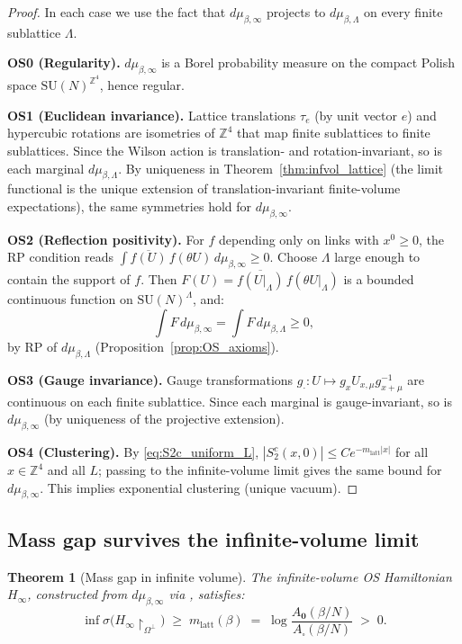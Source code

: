 \documentclass[11pt,a4paper]{amsart}
\newtheorem{theorem}{Theorem}[section]
\theoremstyle{definition}
\newcommand{\SU}{\mathrm{SU}}
\newcommand{\Z}{\mathbb{Z}}
\begin{document}
\begin{proof}
In each case we use the fact that $d\mu_{\beta,\infty}$ projects to $d\mu_{\beta,\Lambda}$
on every finite sublattice $\Lambda$.

\textbf{OS0 (Regularity).}
$d\mu_{\beta,\infty}$ is a Borel probability measure on the compact Polish space
$\SU(N)^{\Z^4}$, hence regular.

\textbf{OS1 (Euclidean invariance).}
Lattice translations $\tau_e$ (by unit vector $e$) and hypercubic rotations are
isometries of $\Z^4$ that map finite sublattices to finite sublattices.  Since
the Wilson action is translation- and rotation-invariant, so is each marginal
$d\mu_{\beta,\Lambda}$.  By uniqueness in Theorem~\ref{thm:infvol_lattice}
(the limit functional is the unique extension of translation-invariant finite-volume
expectations), the same symmetries hold for $d\mu_{\beta,\infty}$.

\textbf{OS2 (Reflection positivity).}
For $f$ depending only on links with $x^0 \ge 0$, the RP condition reads
$\int \overline{f(U)}\,f(\theta U)\,d\mu_{\beta,\infty}\ge 0$.
Choose $\Lambda$ large enough to contain the support of $f$.  Then
$F(U) = \overline{f(U|_\Lambda)}\,f(\theta U|_\Lambda)$ is a bounded continuous
function on $\SU(N)^\Lambda$, and:
\[
  \int F\,d\mu_{\beta,\infty} = \int F\,d\mu_{\beta,\Lambda} \ge 0,
\]
by RP of $d\mu_{\beta,\Lambda}$ (Proposition~\ref{prop:OS_axioms}).

\textbf{OS3 (Gauge invariance).}
Gauge transformations $g_\cdot\colon U\mapsto g_xU_{x,\mu}g_{x+\mu}^{-1}$ are
continuous on each finite sublattice.  Since each marginal is gauge-invariant,
so is $d\mu_{\beta,\infty}$ (by uniqueness of the projective extension).

\textbf{OS4 (Clustering).}
By \eqref{eq:S2c_uniform_L}, $|S_2^c(x,0)|\le Ce^{-m_{\mathrm{latt}}|x|}$ for all
$x\in\Z^4$ and all $L$; passing to the infinite-volume limit gives the same bound for
$d\mu_{\beta,\infty}$.  This implies exponential clustering (unique vacuum).
\end{proof}

\subsection{Mass gap survives the infinite-volume limit}
\label{sec:infvol_gap}

\begin{theorem}[Mass gap in infinite volume]
\label{thm:infvol_gap}
The infinite-volume OS Hamiltonian $H_\infty$, constructed from $d\mu_{\beta,\infty}$
via \cite[Thm.~3.3]{OS75}, satisfies:
\[
  \inf\sigma\!\bigl(H_\infty\!\restriction_{\Omega^\perp}\bigr)
  \;\ge\; m_{\mathrm{latt}}(\beta)
  \;=\; \log\!\frac{A_\mathbf{0}(\beta/N)}{A_\square(\beta/N)}
  \;>\; 0.
\]
\end{theorem}
\end{document}
